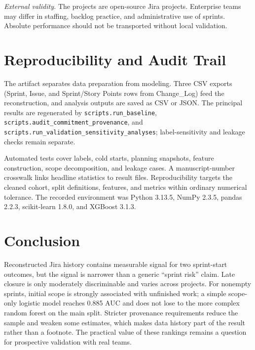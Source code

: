 \documentclass[conference]{IEEEtran}
\begin{document}
\textit{External validity.} The projects are open-source Jira projects. Enterprise teams may differ in staffing, backlog practice, and administrative use of sprints. Absolute performance should not be transported without local validation.

\balance
\section{Reproducibility and Audit Trail}
The artifact separates data preparation from modeling. Three CSV exports (Sprint, Issue, and Sprint/Story Points rows from Change\_Log) feed the reconstruction, and analysis outputs are saved as CSV or JSON. The principal results are regenerated by \texttt{scripts.run\_baseline}, \texttt{scripts.audit\_commitment\_provenance}, and \texttt{scripts.run\_validation\_sensitivity\_analyses}; label-sensitivity and leakage checks remain separate.

Automated tests cover labels, cold starts, planning snapshots, feature construction, scope decomposition, and leakage cases. A manuscript-number crosswalk links headline statistics to result files. Reproducibility targets the cleaned cohort, split definitions, features, and metrics within ordinary numerical tolerance. The recorded environment was Python 3.13.5, NumPy 2.3.5, pandas 2.2.3, scikit-learn 1.8.0, and XGBoost 3.1.3.

\section{Conclusion}
Reconstructed Jira history contains measurable signal for two sprint-start outcomes, but the signal is narrower than a generic ``sprint risk'' claim. Late closure is only moderately discriminable and varies across projects. For nonempty sprints, initial scope is strongly associated with unfinished work; a simple scope-only logistic model reaches 0.885 AUC and does not lose to the more complex random forest on the main split. Stricter provenance requirements reduce the sample and weaken some estimates, which makes data history part of the result rather than a footnote. The practical value of these rankings remains a question for prospective validation with real teams.
\end{document}
